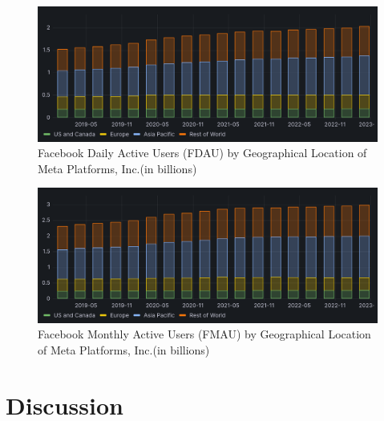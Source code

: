 \documentclass[12pt, a4paper]{article}
\begin{document}
\begin{figure}[H]
    \centering
    \includegraphics[width=1.00\textwidth]{facebook-dau}
    \caption{Facebook Daily Active Users (FDAU) by Geographical Location of Meta
    Platforms, Inc.(in billions)\cite{2023q1,2021q2Slides,2019q4Slides}}
    \label{fig:facebook-dau}
\end{figure}

\begin{figure}[H]
    \centering
    \includegraphics[width=1.00\textwidth]{facebook-mau}
    \caption{Facebook Monthly Active Users (FMAU) by Geographical Location of
    Meta Platforms, Inc.(in billions)\cite{2023q1,2021q2Slides,2019q4Slides}}
    \label{fig:facebook-mau}
\end{figure}

\section*{Discussion}

\end{document}

